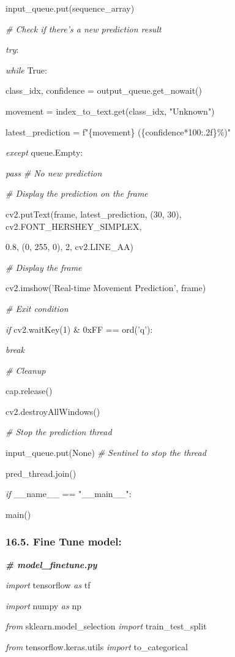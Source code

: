 \documentclass[
]{article}
\begin{document}
input\_queue.put(sequence\_array)

\emph{\# Check if there's a new prediction result}

\emph{try}:

\emph{while} True:

class\_idx, confidence = output\_queue.get\_nowait()

movement = index\_to\_text.get(class\_idx, "Unknown")

latest\_prediction = f"\{movement\} (\{confidence*100:.2f\}\%)"

\emph{except} queue.Empty:

\emph{pass} \emph{\# No new prediction}

\emph{\# Display the prediction on the frame}

cv2.putText(frame, latest\_prediction, (30, 30), cv2.FONT\_HERSHEY\_SIMPLEX,

0.8, (0, 255, 0), 2, cv2.LINE\_AA)

\emph{\# Display the frame}

cv2.imshow('Real-time Movement Prediction', frame)

\emph{\# Exit condition}

\emph{if} cv2.waitKey(1) \& 0xFF == ord('q'):

\emph{break}

\emph{\# Cleanup}

cap.release()

cv2.destroyAllWindows()

\emph{\# Stop the prediction thread}

input\_queue.put(None) \emph{\# Sentinel to stop the thread}

pred\_thread.join()

\emph{if} \_\_name\_\_ == "\_\_main\_\_":

main()

\hypertarget{fine-tune-model}{%
\subsubsection{16.5. Fine Tune model:}\label{fine-tune-model}}

\emph{\textbf{\# model\_finetune.py}}

\emph{import} tensorflow \emph{as} tf

\emph{import} numpy \emph{as} np

\emph{from} sklearn.model\_selection \emph{import} train\_test\_split

\emph{from} tensorflow.keras.utils \emph{import} to\_categorical
\end{document}
